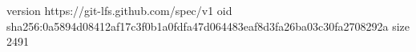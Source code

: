 version https://git-lfs.github.com/spec/v1
oid sha256:0a5894d08412af17c3f0b1a0fdfa47d064483eaf8d3fa26ba03c30fa2708292a
size 2491
